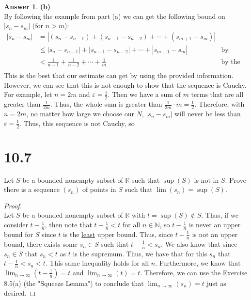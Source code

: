 \documentclass[10pt,a4paper]{article}
\theoremstyle{definition}
\newtheorem*{answer*}{Answer}
\begin{document}
\begin{answer*}{\textbf{(b)}}
\\By following the example from part (a) we can get the following bound on $|s_n - s_m|$ (for $n > m$):
\begin{align*}
|s_n - s_m| &= |(s_n - s_{n - 1}) + (s_{n-1} - s_{n-2}) + \cdots + (s_{m+1} - s_m)|\\
&\leq |s_n - s_{n-1}| + |s_{n-1} - s_{n-2}| + \cdots + |s_{m+1} - s_m| &\text{by Triangle Inequality}\\
&< \frac{1}{n - 1} + \frac{1}{n - 2} + \cdots + \frac{1}{m} &\text{by the definition of the sequence}\\
\end{align*}
This is the best that our estimate can get by using the provided information. However, we can see that this is not enough to show that the sequence is Cauchy. For example, let $n = 2m$ and $\varepsilon = \frac{1}{2}$. Then we have a sum of $m$ terms that are all greater than $\frac{1}{2m}$. Thus, the whole sum is greater than $\frac{1}{2m} \cdot m = \frac{1}{2}$. Therefore, with $n = 2m$, no matter how large we choose our $N$, $|s_n - s_m|$ will never be less than $\varepsilon = \frac{1}{2}$. Thus, this sequence is not Cauchy, so 
\end{answer*}

\section*{10.7}
Let $S$ be a bounded nonempty subset of $\mathbb{R}$ such that $\sup(S)$ is not in $S$. Prove there is a sequence $(s_n)$ of points in $S$ such that $\lim(s_n) = \sup(S)$. 

\begin{proof}{$ $}
\\Let $S$ be a bounded nonempty subset of $\mathbb{R}$ with $t = \sup(S) \not\in S$. Thus, if we consider $t - \frac{1}{n}$, then note that $t - \frac{1}{n} < t$ for all $n \in \mathbb{N}$, so $t - \frac{1}{n}$ is never an upper bound for $S$ since $t$ is the \underline{least} upper bound. Thus, since $t - \frac{1}{n}$ is not an upper bound, there exists some $s_n \in S$ such that $t - \frac{1}{n} < s_n$. We also know that since $s_n \in S$ that $s_n < t$ as $t$ is the supremum. Thus, we have that for this $s_n$ that $t - \frac{1}{n} < s_n < t$. This same inequality holds for all $n$. Furthermore, we know that $\lim_{n \to \infty}(t - \frac{1}{n}) = t$ and $\lim_{n \to \infty}(t) = t$. Therefore, we can use the Exercise 8.5(a) (the "Squeeze Lemma") to conclude that $\lim_{n \to \infty}(s_n) = t$ just as desired. 
\end{proof}
\end{document}
